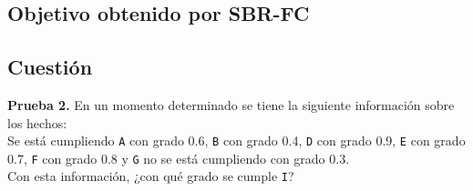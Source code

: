 \subsection{Objetivo obtenido por SBR-FC}

\subsection{Cuestión}
\begin{ejer}
	\textbf{Prueba 2.} En un momento determinado se tiene la siguiente información sobre los hechos:\\
	Se está cumpliendo \texttt{A} con grado 0.6, \texttt{B} con grado 0.4, \texttt{D} con grado 0.9, 
	\texttt{E} con grado 0.7, \texttt{F} con grado 0.8 y \texttt{G} no se está cumpliendo con grado 0.3. \\
	Con esta información, ¿con qué grado se cumple \texttt{I}?
\end{ejer}